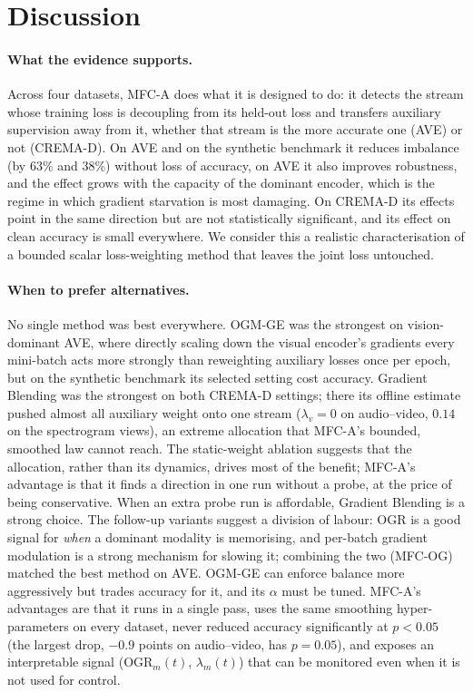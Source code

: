 \documentclass[fleqn,10pt]{wlscirep}
\newcommand{\OGR}{\mathrm{OGR}}
\begin{document}
\section*{Discussion}
\paragraph{What the evidence supports.} Across four datasets, MFC-A does what it is designed to do: it detects the stream whose training loss is decoupling from its held-out loss and transfers auxiliary supervision away from it, whether that stream is the more accurate one (AVE) or not (CREMA-D). On AVE and on the synthetic benchmark it reduces imbalance (by 63\% and 38\%) without loss of accuracy, on AVE it also improves robustness, and the effect grows with the capacity of the dominant encoder, which is the regime in which gradient starvation is most damaging. On CREMA-D its effects point in the same direction but are not statistically significant, and its effect on clean accuracy is small everywhere. We consider this a realistic characterisation of a bounded scalar loss-weighting method that leaves the joint loss untouched.

\paragraph{When to prefer alternatives.} No single method was best everywhere. OGM-GE was the strongest on vision-dominant AVE, where directly scaling down the visual encoder's gradients every mini-batch acts more strongly than reweighting auxiliary losses once per epoch, but on the synthetic benchmark its selected setting cost accuracy. Gradient Blending was the strongest on both CREMA-D settings; there its offline estimate pushed almost all auxiliary weight onto one stream ($\lambda_v{=}0$ on audio--video, $0.14$ on the spectrogram views), an extreme allocation that MFC-A's bounded, smoothed law cannot reach. The static-weight ablation suggests that the allocation, rather than its dynamics, drives most of the benefit; MFC-A's advantage is that it finds a direction in one run without a probe, at the price of being conservative. When an extra probe run is affordable, Gradient Blending is a strong choice. The follow-up variants suggest a division of labour: OGR is a good signal for \emph{when} a dominant modality is memorising, and per-batch gradient modulation is a strong mechanism for slowing it; combining the two (MFC-OG) matched the best method on AVE. OGM-GE can enforce balance more aggressively but trades accuracy for it, and its $\alpha$ must be tuned. MFC-A's advantages are that it runs in a single pass, uses the same smoothing hyper-parameters on every dataset, never reduced accuracy significantly at $p<0.05$ (the largest drop, $-0.9$ points on audio--video, has $p{=}0.05$), and exposes an interpretable signal ($\OGR_m(t)$, $\lambda_m(t)$) that can be monitored even when it is not used for control.
\end{document}
